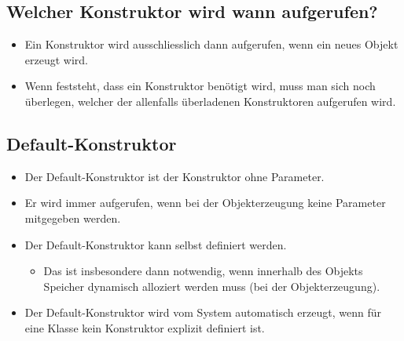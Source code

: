 \subsection{Welcher Konstruktor wird wann aufgerufen?}
\begin{itemize}
	\item Ein Konstruktor wird ausschliesslich dann aufgerufen, wenn ein neues Objekt erzeugt wird.
	\item Wenn feststeht, dass ein Konstruktor benötigt wird, muss man sich noch überlegen, welcher der allenfalls überladenen Konstruktoren aufgerufen wird.
\end{itemize}

\subsection{Default-Konstruktor}
\begin{itemize}
	\item Der Default-Konstruktor ist der Konstruktor ohne Parameter.
	\item Er wird immer aufgerufen, wenn bei der Objekterzeugung keine Parameter mitgegeben werden.
	\item Der Default-Konstruktor kann selbst definiert werden.
	\begin{itemize}
		\item Das ist insbesondere dann notwendig, wenn innerhalb des Objekts Speicher dynamisch alloziert werden muss (bei der Objekterzeugung).
	\end{itemize}
	\item Der Default-Konstruktor wird vom System automatisch erzeugt, wenn für eine Klasse kein Konstruktor explizit definiert ist.
\end{itemize}

